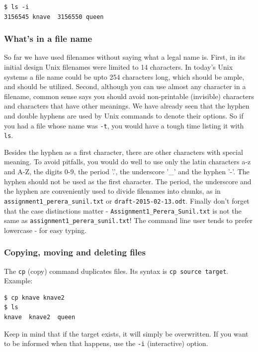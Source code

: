 \documentclass[11pt,a4paper,twoside]{article}
\begin{document}
\begin{lstlisting}[frame=single]
$ ls -i
3156545 knave  3156550 queen
\end{lstlisting}


\subsubsection{What's in a file name}

So far we have used filenames without saying what a legal name is. First,
in its initial design Unix filenames were limited to 14 characters. In
today's Unix systems a file name could be upto 254 characters long, which 
should be ample, and should be utilized. Second, although you can use almost
any character in a filename, common sense says you should avoid non-printable
(invisible) characters and characters that have other meanings. We have
already seen that the hyphen and double hyphens are used by Unix commands
to denote their options. So if you had a file whose name was \texttt{-t},
you would have a tough time listing it with \texttt{ls}.

Besides the hyphen as a first character, there are other characters with
special meaning. To avoid pitfalls, you would do well to use only the 
latin characters a-z and A-Z, the digits 0-9, the period '.', the 
underscore '\_' and the hyphen '-'. The hyphen should not be used as the 
first character. The period, the underscore and the hyphen are conveniently 
used to divide filenames into chunks, as in 
\texttt{assignment1\_perera\_sunil.txt} or \texttt{draft-2015-02-13.odt}. 
Finally don't forget that the case distinctions matter - 
\texttt{Assignment1\_Perera\_Sunil.txt} is not the 
same as \texttt{assignment1\_perera\_sunil.txt}!  The command line user 
tends to prefer lowercase - for easy typing.

\subsubsection{Copying, moving and deleting files}

The \texttt{cp} (copy) command duplicates files. Its syntax is \texttt{cp
source target}. Example:

\begin{lstlisting}[frame=single]
$ cp knave knave2
$ ls
knave  knave2  queen
\end{lstlisting}

Keep in mind that if the target exists, it will simply be overwritten. If
you want to be informed when that happens, use the \texttt{-i} (interactive)
option.
\end{document}
